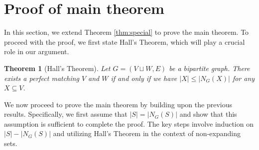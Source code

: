 \documentclass{amsart}
\newtheorem{theorem}{Theorem}[section]
\theoremstyle{definition}
\theoremstyle{remark}
\numberwithin{equation}{section}
\begin{document}
\section{Proof of main theorem}\label{sec:proofmain}

In this section, we extend Theorem \ref{thm:special} to prove the main theorem. To proceed with the proof, we first state Hall’s Theorem, which will play a crucial role in our argument.

\begin{theorem}[Hall's Theorem\cite{Hall}]
Let $G=(V\sqcup W, E)$ be a bipartite graph. There exists a perfect matching $V$ and $W$ if and only if we have $|X|\le |N_G(X)|$ for any $X\subseteq V$.
\end{theorem}


We now proceed to prove the main theorem by building upon the previous results. Specifically, we first assume that  $|S|=|N_G(S)|$ and show that this assumption is sufficient to complete the proof. The key steps involve induction on $ |S| - |N_G(S)| $ and utilizing Hall’s Theorem in the context of non-expanding sets.
\end{document}
